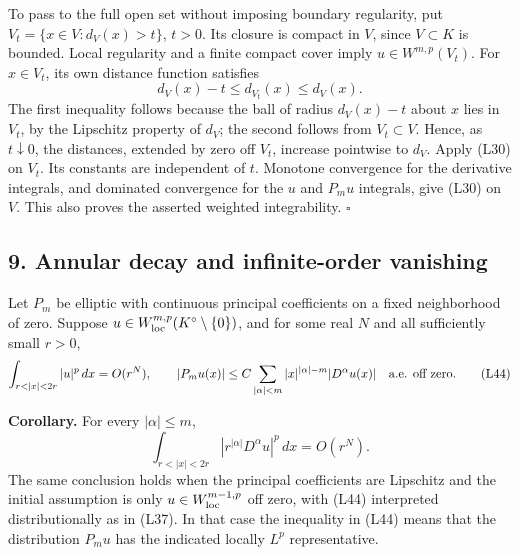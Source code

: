 \documentclass[
  11pt,
]{article}
\makeatletter
\let\ReaderOriginalAnchorStart\hyper@anchorstart
\let\ReaderOriginalAnchorEnd\hyper@anchorend
\let\ReaderPendingAliases\@empty
\def\ReaderArmAliases#1{\gdef\ReaderPendingAliases{#1}}
\def\hyper@anchorstart#1{\ReaderIfNativeAnchorTF{#1}{\ReaderPendingAliases\global\let\ReaderPendingAliases\@empty}{}\ReaderOriginalAnchorStart{#1}}
\makeatother
\begin{document}
To pass to the full open set without imposing boundary regularity, put
\(V_t=\{x\in V:d_V(x)>t\}\), \(t>0\). Its closure is compact in \(V\),
since \(V\subset K\) is bounded. Local regularity and a finite compact
cover imply \(u\in W^{m,p}(V_t)\). For \(x\in V_t\), its own distance
function satisfies \[
d_V(x)-t\leq d_{V_t}(x)\leq d_V(x).                               \tag{L43}
\] The first inequality follows because the ball of radius \(d_V(x)-t\)
about \(x\) lies in \(V_t\), by the Lipschitz property of \(d_V\); the
second follows from \(V_t\subset V\). Hence, as \(t\downarrow0\), the
distances, extended by zero off \(V_t\), increase pointwise to \(d_V\).
Apply (L30) on \(V_t\). Its constants are independent of \(t\). Monotone
convergence for the derivative integrals, and dominated convergence for
the \(u\) and \(P_mu\) integrals, give (L30) on \(V\). This also proves
the asserted weighted integrability. \(\square\)

\ReaderArmAliases{\ReaderOriginalAnchorStart{AN03-LCE-009}\ReaderOriginalAnchorEnd\begingroup\expandafter\def\csname @currentHref\endcsname{AN03-LCE-009}\label{AN03-LCE-009}\endgroup\ReaderOriginalAnchorStart{an03-lce-009-annular-decay-and-infinite-order-vanishing}\ReaderOriginalAnchorEnd\begingroup\expandafter\def\csname @currentHref\endcsname{an03-lce-009-annular-decay-and-infinite-order-vanishing}\label{an03-lce-009-annular-decay-and-infinite-order-vanishing}\endgroup\ReaderOriginalAnchorStart{9-annular-decay-and-infinite-order-vanishing}\ReaderOriginalAnchorEnd\begingroup\expandafter\def\csname @currentHref\endcsname{9-annular-decay-and-infinite-order-vanishing}\label{9-annular-decay-and-infinite-order-vanishing}\endgroup\ReaderOriginalAnchorStart{annular-decay-and-infinite-order-vanishing}\ReaderOriginalAnchorEnd}
\subsection{9. Annular decay and infinite-order
vanishing}\label{annular-decay-and-infinite-order-vanishing}

Let \(P_m\) be elliptic with continuous principal coefficients on a
fixed neighborhood of zero. Suppose
\(u\in W^{m,p}_{\rm loc}(K^\circ\setminus\{0\})\), and for some real
\(N\) and all sufficiently small \(r>0\), \[
\int_{r<|x|<2r}|u|^p\,dx=O(r^N),\qquad
|P_mu(x)|\leq C\sum_{|\alpha|<m}|x|^{|\alpha|-m}|D^\alpha u(x)|
\quad\hbox{a.e. off zero}.                                      \tag{L44}
\]

\textbf{Corollary.} For every \(|\alpha|\leq m\), \[
\int_{r<|x|<2r}|r^{|\alpha|}D^\alpha u|^p\,dx=O(r^N).             \tag{L45}
\] The same conclusion holds when the principal coefficients are
Lipschitz and the initial assumption is only
\(u\in W^{m-1,p}_{\rm loc}\) off zero, with (L44) interpreted
distributionally as in (L37). In that case the inequality in (L44) means
that the distribution \(P_mu\) has the indicated locally \(L^p\)
representative.
\end{document}
